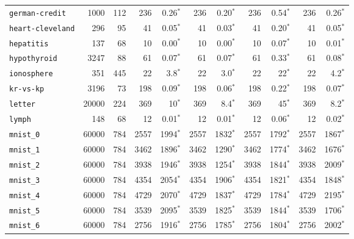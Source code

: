 \begin{tabular}{lccrrrrrrrr}
\texttt{german-credit} & \multicolumn{1}{r}{1000} & \multicolumn{1}{r}{112}  & 236 & 0.26$^*$ & 236 & 0.20$^*$ & 236 & 0.54$^*$ & 236 & 0.26$^*$\\
\texttt{heart-cleveland} & \multicolumn{1}{r}{296} & \multicolumn{1}{r}{95}  & 41 & 0.05$^*$ & 41 & 0.03$^*$ & 41 & 0.20$^*$ & 41 & 0.05$^*$\\
\texttt{hepatitis} & \multicolumn{1}{r}{137} & \multicolumn{1}{r}{68}  & 10 & 0.00$^*$ & 10 & 0.00$^*$ & 10 & 0.07$^*$ & 10 & 0.01$^*$\\
\texttt{hypothyroid} & \multicolumn{1}{r}{3247} & \multicolumn{1}{r}{88}  & 61 & 0.07$^*$ & 61 & 0.07$^*$ & 61 & 0.33$^*$ & 61 & 0.08$^*$\\
\texttt{ionosphere} & \multicolumn{1}{r}{351} & \multicolumn{1}{r}{445}  & 22 & 3.8$^*$ & 22 & 3.0$^*$ & 22 & 22$^*$ & 22 & 4.2$^*$\\
\texttt{kr-vs-kp} & \multicolumn{1}{r}{3196} & \multicolumn{1}{r}{73}  & 198 & 0.09$^*$ & 198 & 0.06$^*$ & 198 & 0.22$^*$ & 198 & 0.07$^*$\\
\texttt{letter} & \multicolumn{1}{r}{20000} & \multicolumn{1}{r}{224}  & 369 & 10$^*$ & 369 & 8.4$^*$ & 369 & 45$^*$ & 369 & 8.2$^*$\\
\texttt{lymph} & \multicolumn{1}{r}{148} & \multicolumn{1}{r}{68}  & 12 & 0.01$^*$ & 12 & 0.01$^*$ & 12 & 0.06$^*$ & 12 & 0.02$^*$\\
\texttt{mnist\_0} & \multicolumn{1}{r}{60000} & \multicolumn{1}{r}{784}  & 2557 & 1994$^*$ & 2557 & 1832$^*$ & 2557 & 1792$^*$ & 2557 & 1867$^*$\\
\texttt{mnist\_1} & \multicolumn{1}{r}{60000} & \multicolumn{1}{r}{784}  & 3462 & 1896$^*$ & 3462 & 1290$^*$ & 3462 & 1774$^*$ & 3462 & 1676$^*$\\
\texttt{mnist\_2} & \multicolumn{1}{r}{60000} & \multicolumn{1}{r}{784}  & 3938 & 1946$^*$ & 3938 & 1254$^*$ & 3938 & 1844$^*$ & 3938 & 2009$^*$\\
\texttt{mnist\_3} & \multicolumn{1}{r}{60000} & \multicolumn{1}{r}{784}  & 4354 & 2054$^*$ & 4354 & 1906$^*$ & 4354 & 1821$^*$ & 4354 & 1848$^*$\\
\texttt{mnist\_4} & \multicolumn{1}{r}{60000} & \multicolumn{1}{r}{784}  & 4729 & 2070$^*$ & 4729 & 1837$^*$ & 4729 & 1784$^*$ & 4729 & 2195$^*$\\
\texttt{mnist\_5} & \multicolumn{1}{r}{60000} & \multicolumn{1}{r}{784}  & 3539 & 2095$^*$ & 3539 & 1825$^*$ & 3539 & 1844$^*$ & 3539 & 1706$^*$\\
\texttt{mnist\_6} & \multicolumn{1}{r}{60000} & \multicolumn{1}{r}{784}  & 2756 & 1916$^*$ & 2756 & 1785$^*$ & 2756 & 1804$^*$ & 2756 & 2002$^*$\\

\end{tabular}
